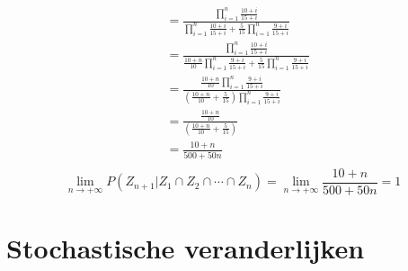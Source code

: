 \documentclass[main.tex]{subfiles}
\begin{document}
\begin{oef}
\begin{itemize}
\[\begin{array}{rl}
      &= \frac{\prod_{i=1}^{n}\frac{10+i}{15+i} }{\prod_{i=1}^{n}\frac{10+i}{15+i}+\frac{5}{15}\prod_{i=1}^{n}\frac{9+i}{15+i}}\\
      &= \frac{\prod_{i=1}^{n}\frac{10+i}{15+i} }{\frac{10+n}{10}\prod_{i=1}^{n}\frac{9+i}{15+i}+\frac{5}{15}\prod_{i=1}^{n}\frac{9+i}{15+i}}\\
      &= \frac{\frac{10+n}{10}\prod_{i=1}^{n}\frac{9+i}{15+i} }{\left(\frac{10+n}{10}+\frac{5}{15}\right)\prod_{i=1}^{n}\frac{9+i}{15+i}}\\
      &= \frac{\frac{10+n}{10}}{\left(\frac{10+n}{10}+\frac{5}{15}\right)}\\
      &= \frac{10+n}{500+50n}\\
    \end{array}
    \]
    \[ \lim_{n \rightarrow +\infty}P(Z_{n+1}|Z_{1} \cap Z_{2} \cap \dotsb \cap Z_{n}) = \lim_{n \rightarrow +\infty}\frac{10+n}{500+50n} = 1 \]
  \end{itemize}
\end{oef}

\section{Stochastische veranderlijken}
\label{sec:stoch-verand}
\end{document}
